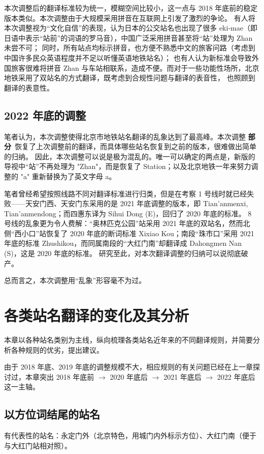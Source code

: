 \documentclass[a4paper,UTF8,12pt]{ctexart}
\begin{document}
        本次调整后的翻译标准较为统一，模糊空间比较小，这一点与 2018 年底前的稳定版本类似。本次调整由于大规模采用拼音在互联网上引发了激烈的争论。\cite{ref16} 
        有人将本次调整视为“文化自信”的表现，认为日本的公交站名也出现了很多 eki-mae（即日语中表示“站前”的词语的罗马音），中国广泛采用拼音甚至将“站”处理为 Zhan 未尝不可；
        同时，所有站点均标示拼音，也方便不熟悉中文的旅客问路（考虑到中国许多民众英语程度并不足以听懂英语地铁站名）；
        也有人认为新标准会导致外国旅客很难将拼音 Zhan 与车站相联系，造成不便。而对于一些功能性场所，北京地铁采用了双站名的方式翻译，既考虑到合规性问题与翻译的表音性，
        也照顾到翻译的表意性。

    \subsection{2022 年底的调整}
        笔者认为，本次调整使得北京市地铁站名翻译的乱象达到了最高峰。本次调整 \textbf{部分}\ 恢复了上次调整前的翻译，而具体哪些站名恢复到之前的版本，很难做出简单的归纳。
        因此，本次调整可以说是极为混乱的。唯一可以确定的两点是，新版的导视中“站”不再处理为 "Zhan"，而是恢复了 Station；以及北京地铁一年来努力调整的 "a" 重新替换为了英文字母 a。

        笔者曾经希望按照线路不同对翻译标准进行归类，但是在考察 1 号线时就已经失败——天安门西、天安门东采用的是 2021 年底调整的版本，即 Tian'anmenxi, Tian'anmendong；而四惠东译为 Sihui Dong (E)，回归了 2020 年底的标准。
        8 号线的乱象更为令人费解：“奥林匹克公园”站采用 2021 年底的双站名，然而北侧“西小口”站恢复了 2020 年底的断词标准 Xixiao Kou；南段“珠市口”采用 2021 年底的标准 Zhushikou，而同属南段的“大红门南”却翻译成 Dahongmen Nan (S)，这是 2020 年底的标准。
        研究至此，对本次翻译调整的归纳可以说彻底破产。

        总而言之，本次调整用“乱象”形容毫不为过。

\section{各类站名翻译的变化及其分析}
    本章以各种站名类别为主线，纵向梳理各类站名近年来的不同翻译规则，并简要分析各种规则的优劣，提出建议。

    由于 2018 年底、2019 年底的调整规模不大，相应规则的有关问题已经在上一章探讨过，本章突出 2018 年底前 $\rightarrow$ 2020 年底后 $\rightarrow$ 2021 年底后 $\rightarrow$ 2022 年底后这一主轴。
    \subsection{以方位词结尾的站名}
        有代表性的站名：永定门外（北京特色，用城门内外标示方位）、大红门南（便于与大红门站相对照）。
\end{document}
